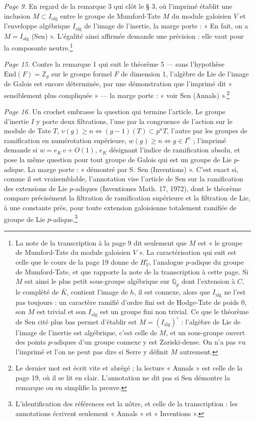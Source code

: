 \documentclass[11pt,a4paper]{article}
\begin{document}
\emph{Page 9.} En regard de la remarque 3 qui clôt le § 3, où l'imprimé
établit une inclusion $M \subset I_{\mathrm{alg}}$ entre le groupe de
Mumford-Tate $M$ du module galoisien $V$ et l'enveloppe algébrique
$I_{\mathrm{alg}}$ de l'image de l'inertie, la marge porte : « En fait, on a
$M = I_{\mathrm{alg}}$ (Sen) ». L'égalité ainsi affirmée demande une
précision : elle vaut pour la composante neutre.\footnote{La note de la
transcription à la page 9 dit seulement que $M$ est « le groupe de
Mumford-Tate du module galoisien $V$ ». La caractérisation qui suit est celle
que le cours de la page 19 donne de $H_V^{\circ}$, l'analogue $p$-adique du
groupe de Mumford-Tate, et que rapporte la note de la transcription à cette
page. Si $M$ est ainsi le plus petit sous-groupe algébrique sur
$\mathbb{Q}_p$ dont l'extension à $C$, le complété de $\bar{K}$, contient
l'image de $h$, il est connexe, alors
que $I_{\mathrm{alg}}$ ne l'est pas toujours : un caractère ramifié d'ordre
fini est de Hodge-Tate de poids $0$, son $M$ est trivial et son
$I_{\mathrm{alg}}$ est un groupe fini non trivial. Ce que le théorème de Sen
cité plus bas permet d'établir est $M = (I_{\mathrm{alg}})^{\circ}$ :
l'algèbre de Lie de l'image de l'inertie est algébrique, c'est celle de $M$,
et un sous-groupe ouvert des points $p$-adiques d'un groupe connexe y est
Zariski-dense. On n'a pas vu l'imprimé et l'on ne peut pas dire si Serre y
définit $M$ autrement.}

\emph{Page 15.} Contre la remarque 1 qui suit le théorème 5 --- sans
l'hypothèse $\mathrm{End}(F) = \mathbb{Z}_p$ sur le groupe formel $F$ de
dimension 1, l'algèbre de Lie de l'image de Galois est encore déterminée,
par une démonstration que l'imprimé dit « sensiblement plus compliquée » ---
la marge porte : « voir Sen (Annals) ».\footnote{Le dernier mot est écrit vite
et abrégé ; la lecture « Annals » est celle de la page 19, où il se lit en
clair. L'annotation ne dit pas si Sen démontre la remarque ou en simplifie la
preuve.}

\emph{Page 16.} Un crochet embrasse la question qui termine l'article. Le
groupe d'inertie $I$ y porte deux filtrations, l'une par la congruence de
l'action sur le module de Tate $T$, $v(g) \geqslant n \iff (g-1)(T) \subset
p^n T$, l'autre par les groupes de ramification en numérotation supérieure,
$w(g) \geqslant n \iff g \in I^n$ ; l'imprimé demande si $w = e_K\, v +
O(1)$, $e_K$ désignant l'indice de ramification absolu, et pose la même
question pour tout groupe de Galois qui est un groupe de Lie $p$-adique. La
marge porte : « démontré par S. Sen (Inventions) ». C'est exact si, comme il
est vraisemblable, l'annotation vise l'article de Sen sur la ramification des
extensions de Lie $p$-adiques (Inventiones Math. 17, 1972), dont le théorème
compare précisément la filtration de ramification supérieure et la filtration
de Lie, à une constante près, pour toute extension galoisienne totalement
ramifiée de groupe de Lie $p$-adique.\footnote{L'identification des
références est la nôtre, et celle de la transcription : les annotations
écrivent seulement « Annals » et « Inventions ».}
\end{document}
